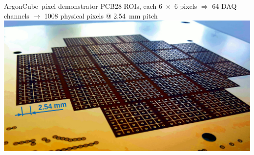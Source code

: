 \documentclass[]{beamer}
\newcommand*{\emphcol}{blue}
\newcommand*{\AC}{{ArgonCube}}
\begin{document}
\begin{frame}{\AC\ pixel demonstrator PCB}{\num{28} ROIs, each \num{6 x 6} pixels $\Rightarrow$ {\color{\emphcol} \num{64} DAQ channels $\rightarrow$ \num{1008} physical pixels} @ \SI{2.54}{\milli\meter} pitch}
	\centering
	\includegraphics[width=\textwidth]{viper/pixies}
\end{frame}
\end{document}
